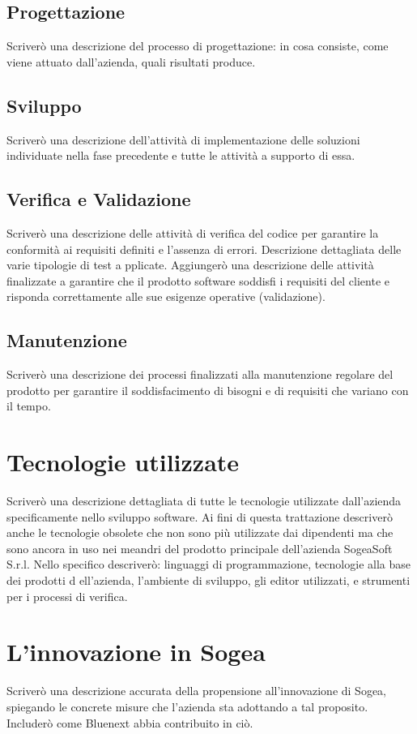         \subsection{Progettazione}
        Scriverò una descrizione del processo di progettazione: in cosa consiste, come viene attuato
        dall’azienda, quali risultati produce.
        \subsection{Sviluppo}
        Scriverò una descrizione dell’attività di implementazione delle soluzioni individuate nella
        fase precedente e tutte le attività a supporto di essa.
        \subsection{Verifica e Validazione}
        Scriverò una descrizione delle attività di verifica del codice per garantire la conformità ai
        requisiti definiti e l'assenza di errori. Descrizione dettagliata delle varie tipologie di test a       pplicate.
        Aggiungerò una descrizione delle attività finalizzate a garantire che il prodotto software
        soddisfi i requisiti del cliente e risponda correttamente alle sue      esigenze operative
        (validazione).
        \subsection{Manutenzione}
        Scriverò una descrizione dei processi finalizzati alla manutenzione regolare del prodotto per
        garantire il soddisfacimento di bisogni e di requisiti che variano con il tempo.
    \section{Tecnologie utilizzate}
    Scriverò una descrizione dettagliata di tutte le tecnologie utilizzate dall’azienda specificamente nello
    sviluppo software. Ai fini di questa trattazione descriverò anche le tecnologie obsolete che non sono
    più utilizzate dai dipendenti ma che sono ancora in uso nei meandri del prodotto principale
    dell’azienda SogeaSoft S.r.l.
    Nello specifico descriverò: linguaggi di programmazione, tecnologie alla base dei prodotti
    d   ell’azienda, l’ambiente di sviluppo, gli editor utilizzati, e       strumenti per i processi di verifica.
    \section{L’innovazione in Sogea}
    Scriverò una descrizione accurata della propensione all’innovazione di Sogea, spiegando le concrete
    misure che l’azienda sta adottando a tal proposito. Includerò come Bluenext abbia contribuito in ciò.